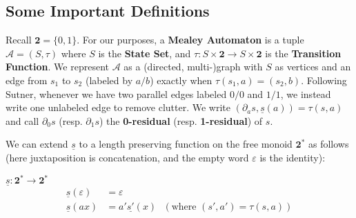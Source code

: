 \documentclass[final]{ws-ijac}
\newcommand{\A}{\mathcal{A}}
\newcommand{\2}{\textbf{2}}
\newcommand{\del}{\partial}
\begin{document}
\subsection{Some Important Definitions}

Recall $\2 = \{0,1\}$. For our purposes, a \textbf{Mealey Automaton} is a 
tuple $\A = (S, \tau)$ where $S$ is the \textbf{State Set}, and 
$\tau : S \times \2 \to S \times \2$ is the \textbf{Transition Function}. 
We represent $\A$ as a (directed, multi-)graph with $S$ as vertices and an
edge from $s_1$ to $s_2$ (labeled by $a/b$) exactly when $\tau(s_1,a) = (s_2,b)$.
Following Sutner, whenever we have two parallel edges labeled $0/0$ and $1/1$,
we instead write one unlabeled edge to remove clutter.
We write $(\del_a s, \underline{s}(a)) = \tau(s,a)$ and call $\del_0 s$ 
(resp. $\del_1 s$) the \textbf{0-residual} (resp. \textbf{1-residual}) of $s$.

We can extend $\underline{s}$ to a length preserving function on the 
free monoid $\2^*$ as follows (here juxtaposition is concatenation, 
and the empty word $\varepsilon$ is the identity):

$\underline{s} : \2^* \to \2^*$
\begin{align*}
  \underline{s}(\varepsilon) &= \varepsilon\\
  \underline{s}(ax)       &= a' \underline{s'}(x) 
  ~~~(\text{where } (s', a') = \tau(s,a))
\end{align*}
\end{document}

